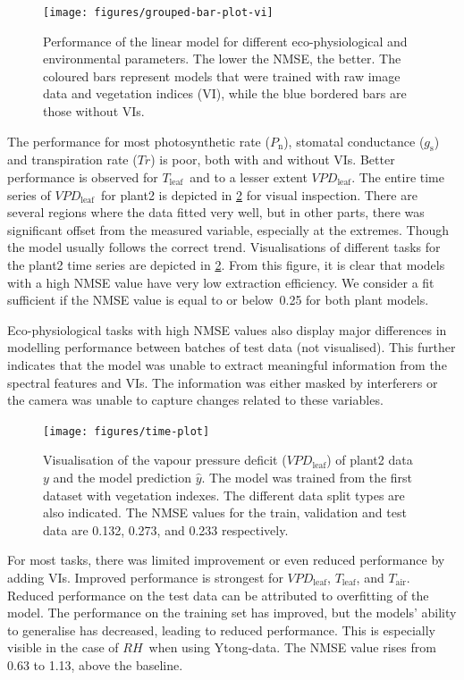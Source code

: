 \documentclass[10pt,authoryear,a4paper]{elsarticle}
\newcommand{\VPDL}{$VPD_\text{leaf}$}
\newcommand{\Tair}{$T_\text{air}$}
\newcommand{\Tleaf}{$T_\text{leaf}$}
\newcommand{\Cond}{$g_\text{s}$}
\newcommand{\Photo}{$P_\text{n}$}
\newcommand{\Transp}{$Tr$}
\newcommand{\RH}{$RH$}
\begin{document}
        \begin{figure}[thb]
            \centering
            \texttt{[image: figures/grouped-bar-plot-vi]}
            \caption{Performance of the linear model for different eco-physiological and environmental parameters. The lower the NMSE, the better. The coloured bars represent models that were trained with raw image data and vegetation indices (VI), while the blue bordered bars are those without VIs.}
            \label{overview-vi}
        \end{figure}
        
        The performance for most photosynthetic rate (\Photo), stomatal conductance (\Cond) and transpiration rate (\Transp) is poor, both with and without VIs. Better performance is observed for \Tleaf\ and to a lesser extent \VPDL. The entire time series of \VPDL\ for plant2 is depicted in \cref{time-plot} for visual inspection. There are several regions where the data fitted very well, but in other parts, there was significant offset from the measured variable, especially at the extremes. Though the model usually follows the correct trend. Visualisations of different tasks for the plant2 time series are depicted in \cref{time-plot}. From this figure, it is clear that models with a high NMSE value have very low extraction efficiency. We consider a fit sufficient if the NMSE value is equal to or below~0.25 for both plant models. 
        
        Eco-physiological tasks with high NMSE values also display major differences in modelling performance between batches of test data (not visualised). This further indicates that the model was unable to extract meaningful information from the spectral features and VIs. The information was either masked by interferers or the camera was unable to capture changes related to these variables. 
        
        \begin{figure}[thb]
            \centering
            \texttt{[image: figures/time-plot]}
            \caption{Visualisation of the vapour pressure deficit (\VPDL) of plant2 data $y$ and the model prediction $\hat{y}$. The model was trained from the first dataset with vegetation indexes. The different data split types are also indicated. The NMSE values for the train, validation and test data are 0.132, 0.273, and 0.233 respectively.}
            \label{time-plot}
        \end{figure}
        
        For most tasks, there was limited improvement or even reduced performance by adding VIs. Improved performance is strongest for \VPDL, \Tleaf, and \Tair. Reduced performance on the test data can be attributed to overfitting of the model. The performance on the training set has improved, but the models' ability to generalise has decreased, leading to reduced performance. This is especially visible in the case of \RH\ when using Ytong-data. The NMSE value rises from 0.63 to 1.13, above the baseline.   
        
\end{document}
